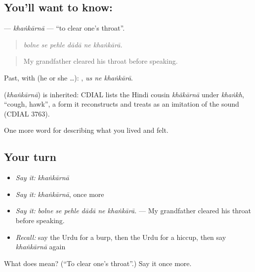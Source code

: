 \subsection*{You'll want to know: }
\textbf{} — \emph{khaṅkārnā} — \textquotedblleft{}to clear one's throat\textquotedblright{}.

\begin{quote}
     
\end{quote}

\begin{quote}
\emph{bolne se pehle dādā ne khaṅkārā.}
\end{quote}

\begin{quote}
My grandfather cleared his throat before speaking.
\end{quote}

Past, with  (he or she …):   , \emph{us ne khaṅkārā}.

\begin{cousinweb}
\textbf{} (\emph{khaṅkārnā}) is inherited: CDIAL lists the Hindi cousin \emph{khãkārnā} under \emph{khaṅkh}, \textquotedblleft{}cough, hawk\textquotedblright{}, a form it reconstructs and treats as an imitation of the sound (CDIAL 3763).
\end{cousinweb}

\begin{grammarlens}[title={What you've built}]
One more word for describing what you lived and felt.
\end{grammarlens}

\subsection*{Your turn}
\begin{itemize}
\raggedright
  \item \emph{Say it:} \emph{khaṅkārnā}
  \item \emph{Say it:} \emph{khaṅkārnā}, once more
  \item \emph{Say it:} \emph{bolne se pehle dādā ne khaṅkārā.} — My grandfather cleared his throat before speaking.
  \item \emph{Recall:} say the Urdu for a burp, then the Urdu for a hiccup, then say \emph{khaṅkārnā} again
\end{itemize}

\begin{tcolorbox}[breakable,colback=teal!4,colframe=teal!35!black,title={Before you move on}]
What does  mean? (\textquotedblleft{}To clear one's throat\textquotedblright{}.) Say it once more.
\end{tcolorbox}

